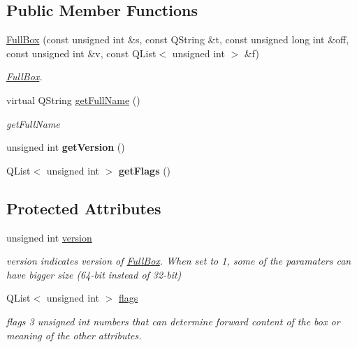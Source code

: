 \subsection*{Public Member Functions}
\begin{DoxyCompactItemize}
\item 
\hyperlink{class_full_box_a8100480df424c64f018df90151142ec8}{Full\-Box} (const unsigned int \&s, const Q\-String \&t, const unsigned long int \&off, const unsigned int \&v, const Q\-List$<$ unsigned int $>$ \&f)
\begin{DoxyCompactList}\small\item\em \hyperlink{class_full_box}{Full\-Box}. \end{DoxyCompactList}\item 
virtual Q\-String \hyperlink{class_full_box_a0701464d8e7386653f025833308f76ee}{get\-Full\-Name} ()
\begin{DoxyCompactList}\small\item\em get\-Full\-Name \end{DoxyCompactList}\item 
\hypertarget{class_full_box_afc93cc08ed7bc9b30ed219fd9b29d8a6}{unsigned int {\bfseries get\-Version} ()}\label{class_full_box_afc93cc08ed7bc9b30ed219fd9b29d8a6}

\item 
\hypertarget{class_full_box_a3569e34dffcdf998407fc2a77e5beb63}{Q\-List$<$ unsigned int $>$ {\bfseries get\-Flags} ()}\label{class_full_box_a3569e34dffcdf998407fc2a77e5beb63}

\end{DoxyCompactItemize}
\subsection*{Protected Attributes}
\begin{DoxyCompactItemize}
\item 
\hypertarget{class_full_box_a1fcf373fb0a760b702c02c20c18bb089}{unsigned int \hyperlink{class_full_box_a1fcf373fb0a760b702c02c20c18bb089}{version}}\label{class_full_box_a1fcf373fb0a760b702c02c20c18bb089}

\begin{DoxyCompactList}\small\item\em version indicates version of \hyperlink{class_full_box}{Full\-Box}. When set to 1, some of the paramaters can have bigger size (64-\/bit instead of 32-\/bit) \end{DoxyCompactList}\item 
\hypertarget{class_full_box_a3bfedd3ddb29af4762e0ef40c4c6830b}{Q\-List$<$ unsigned int $>$ \hyperlink{class_full_box_a3bfedd3ddb29af4762e0ef40c4c6830b}{flags}}\label{class_full_box_a3bfedd3ddb29af4762e0ef40c4c6830b}

\begin{DoxyCompactList}\small\item\em flags 3 unsigned int numbers that can determine forward content of the box or meaning of the other attributes. \end{DoxyCompactList}\end{DoxyCompactItemize}


